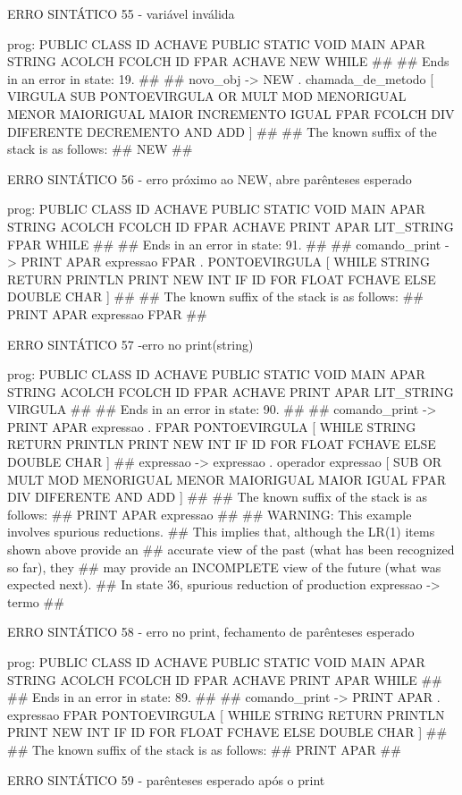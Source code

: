 \documentclass[12pt,a4paper,twoside]{report}
\begin{document}
\begin{terminal}
{ERRO SINTÁTICO 55 - variável inválida

prog: PUBLIC CLASS ID ACHAVE PUBLIC STATIC VOID MAIN APAR STRING ACOLCH FCOLCH ID FPAR ACHAVE NEW WHILE 
##
## Ends in an error in state: 19.
##
## novo_obj -> NEW . chamada_de_metodo [ VIRGULA SUB PONTOEVIRGULA OR MULT MOD MENORIGUAL MENOR MAIORIGUAL MAIOR INCREMENTO IGUAL FPAR FCOLCH DIV DIFERENTE DECREMENTO AND ADD ]
##
## The known suffix of the stack is as follows:
## NEW 
##

ERRO SINTÁTICO 56 - erro próximo ao NEW, abre parênteses esperado

prog: PUBLIC CLASS ID ACHAVE PUBLIC STATIC VOID MAIN APAR STRING ACOLCH FCOLCH ID FPAR ACHAVE PRINT APAR LIT_STRING FPAR WHILE 
##
## Ends in an error in state: 91.
##
## comando_print -> PRINT APAR expressao FPAR . PONTOEVIRGULA [ WHILE STRING RETURN PRINTLN PRINT NEW INT IF ID FOR FLOAT FCHAVE ELSE DOUBLE CHAR ]
##
## The known suffix of the stack is as follows:
## PRINT APAR expressao FPAR 
##

ERRO SINTÁTICO 57 -erro no print(string) 

prog: PUBLIC CLASS ID ACHAVE PUBLIC STATIC VOID MAIN APAR STRING ACOLCH FCOLCH ID FPAR ACHAVE PRINT APAR LIT_STRING VIRGULA 
##
## Ends in an error in state: 90.
##
## comando_print -> PRINT APAR expressao . FPAR PONTOEVIRGULA [ WHILE STRING RETURN PRINTLN PRINT NEW INT IF ID FOR FLOAT FCHAVE ELSE DOUBLE CHAR ]
## expressao -> expressao . operador expressao [ SUB OR MULT MOD MENORIGUAL MENOR MAIORIGUAL MAIOR IGUAL FPAR DIV DIFERENTE AND ADD ]
##
## The known suffix of the stack is as follows:
## PRINT APAR expressao 
##
## WARNING: This example involves spurious reductions.
## This implies that, although the LR(1) items shown above provide an
## accurate view of the past (what has been recognized so far), they
## may provide an INCOMPLETE view of the future (what was expected next).
## In state 36, spurious reduction of production expressao -> termo 
##

ERRO SINTÁTICO 58 - erro no print, fechamento de parênteses esperado

prog: PUBLIC CLASS ID ACHAVE PUBLIC STATIC VOID MAIN APAR STRING ACOLCH FCOLCH ID FPAR ACHAVE PRINT APAR WHILE 
##
## Ends in an error in state: 89.
##
## comando_print -> PRINT APAR . expressao FPAR PONTOEVIRGULA [ WHILE STRING RETURN PRINTLN PRINT NEW INT IF ID FOR FLOAT FCHAVE ELSE DOUBLE CHAR ]
##
## The known suffix of the stack is as follows:
## PRINT APAR 
##

ERRO SINTÁTICO 59 - parênteses esperado após o print

}
\end{terminal}
\end{document}
